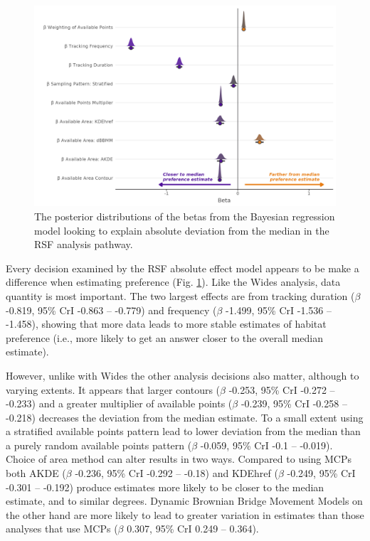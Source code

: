 \documentclass[10pt,a4paper]{article}
\begin{document}
\begin{figure}
\includegraphics[width=1\linewidth]{../figures/rsf_dEstRSF_effectsPlot} \caption{The posterior distributions of the betas from the Bayesian regression model looking to explain absolute deviation from the median in the RSF analysis pathway.}\label{fig:dEstBetasRSF}
\end{figure}

Every decision examined by the RSF absolute effect model appears to be make a difference when estimating preference (Fig. \ref{fig:dEstBetasRSF}).
Like the Wides analysis, data quantity is most important.
The two largest effects are from tracking duration (\(\beta\) -0.819, 95\% CrI -0.863 -- -0.779) and frequency (\(\beta\) -1.499, 95\% CrI -1.536 -- -1.458), showing that more data leads to more stable estimates of habitat preference (i.e., more likely to get an answer closer to the overall median estimate).

However, unlike with Wides the other analysis decisions also matter, although to varying extents.
It appears that larger contours (\(\beta\) -0.253, 95\% CrI -0.272 -- -0.233) and a greater multiplier of available points (\(\beta\) -0.239, 95\% CrI -0.258 -- -0.218) decreases the deviation from the median estimate.
To a small extent using a stratified available points pattern lead to lower deviation from the median than a purely random available points pattern (\(\beta\) -0.059, 95\% CrI -0.1 -- -0.019).
Choice of area method can alter results in two ways.
Compared to using MCPs both AKDE (\(\beta\) -0.236, 95\% CrI -0.292 -- -0.18) and KDEhref (\(\beta\) -0.249, 95\% CrI -0.301 -- -0.192) produce estimates more likely to be closer to the median estimate, and to similar degrees.
Dynamic Brownian Bridge Movement Models on the other hand are more likely to lead to greater variation in estimates than those analyses that use MCPs (\(\beta\) 0.307, 95\% CrI 0.249 -- 0.364).
\end{document}
